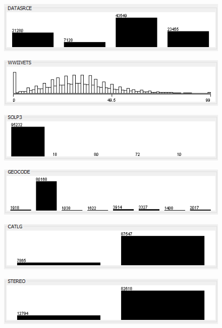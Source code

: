 \begin{figure}
\includegraphics{./images/expl_rep/Cattura2-02-00}
\end{figure}
\begin{figure}
\includegraphics{./images/expl_rep/Cattura2-02-01}
\end{figure}
\begin{figure}
\includegraphics{./images/expl_rep/Cattura2-02-02}
\end{figure}
\begin{figure}
\includegraphics{./images/expl_rep/Cattura2-02-03}
\end{figure}
\begin{figure}
\includegraphics{./images/expl_rep/Cattura2-02-04}
\end{figure}
\begin{figure}
\includegraphics{./images/expl_rep/Cattura2-02-05}
\end{figure}
